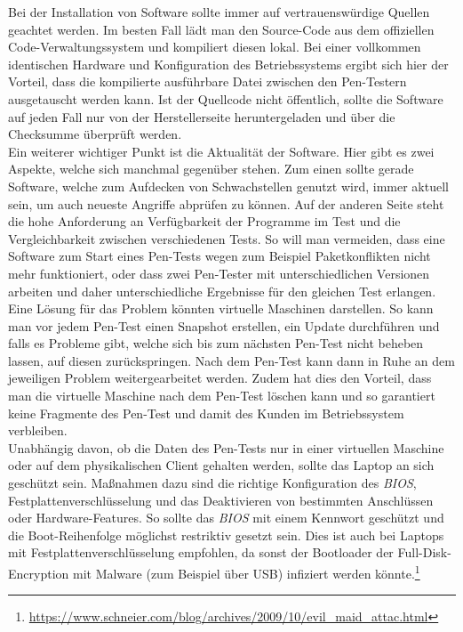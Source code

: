 		Bei der Installation von Software sollte immer auf vertrauenswürdige Quellen geachtet werden. Im besten Fall lädt man den Source-Code aus dem offiziellen Code-Verwaltungssystem und kompiliert diesen lokal. Bei einer vollkommen identischen Hardware und Konfiguration des Betriebssystems ergibt sich hier der Vorteil, dass die kompilierte ausführbare Datei zwischen den Pen-Testern ausgetauscht werden kann. Ist der Quellcode nicht öffentlich, sollte die Software auf jeden Fall nur von der Herstellerseite heruntergeladen und über die Checksumme überprüft werden.\\
		
		Ein weiterer wichtiger Punkt ist die Aktualität der Software. Hier gibt es zwei Aspekte, welche sich manchmal gegenüber stehen. Zum einen sollte gerade Software, welche zum Aufdecken von Schwachstellen genutzt wird, immer aktuell sein, um auch neueste Angriffe abprüfen zu können. Auf der anderen Seite steht die hohe Anforderung an Verfügbarkeit der Programme im Test und die Vergleichbarkeit zwischen verschiedenen Tests. So will man vermeiden, dass eine Software zum Start eines Pen-Tests wegen zum Beispiel Paketkonflikten nicht mehr funktioniert, oder dass zwei Pen-Tester mit unterschiedlichen Versionen arbeiten und daher unterschiedliche Ergebnisse für den gleichen Test erlangen. Eine Lösung für das Problem könnten virtuelle Maschinen darstellen. So kann man vor jedem Pen-Test einen Snapshot erstellen, ein Update durchführen und falls es Probleme gibt, welche sich bis zum nächsten Pen-Test nicht beheben lassen, auf diesen zurückspringen. Nach dem Pen-Test kann dann in Ruhe an dem jeweiligen Problem weitergearbeitet werden. Zudem hat dies den Vorteil, dass man die virtuelle Maschine nach dem Pen-Test löschen kann und so garantiert keine Fragmente des Pen-Test und damit des Kunden im Betriebssystem verbleiben.\\
		
		Unabhängig davon, ob die Daten des Pen-Tests nur in einer virtuellen Maschine oder auf dem physikalischen Client gehalten werden, sollte das Laptop an sich geschützt sein. Maßnahmen dazu sind die richtige Konfiguration des \textit{BIOS}, Festplattenverschlüsselung und das Deaktivieren von bestimmten Anschlüssen oder Hardware-Features. So sollte das \textit{BIOS} mit einem Kennwort geschützt und die Boot-Reihenfolge möglichst restriktiv gesetzt sein. Dies ist auch bei Laptops mit Festplattenverschlüsselung empfohlen, da sonst der Bootloader der Full-Disk-Encryption mit Malware (zum Beispiel über USB) infiziert werden könnte.\footnote{\url{https://www.schneier.com/blog/archives/2009/10/evil_maid_attac.html}}
